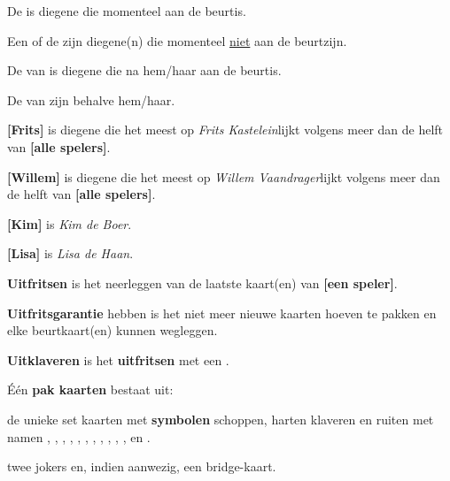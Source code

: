 \item De \huidigeSpeler is diegene die momenteel aan de beurt\footnotemark[1] is.  

\item Een \andereSpeler of de \andereSpelers zijn diegene(n) die momenteel \ul{niet} aan de beurt\footnotemark[1] zijn. 

\item De \volgendeSpeler van \eenSpeler is diegene die na hem/haar aan de beurt\footnotemark[1] is. 

\item De \medeSpelers van \eenSpeler zijn \alleSpelers behalve hem/haar.

\item \textbf{[Frits]} is diegene die het meest op \textit{Frits Kastelein}\footnotemark[2] lijkt volgens meer dan de helft van \textbf{[alle spelers]\footnotemark[3]}.

\item \textbf{[Willem]} is diegene die het meest op \textit{Willem Vaandrager}\footnotemark[2] lijkt volgens meer dan de helft van \textbf{[alle spelers]\footnotemark[3]}.

\item \label{item:kim}\textbf{[Kim]} is \textit{Kim de Boer}.

\item \label{item:lisa}\textbf{[Lisa]} is \textit{Lisa de Haan}.

\item \label{item:uitfritsen} \textbf{Uitfritsen} is het neerleggen van de laatste kaart(en) van \textbf{[een speler]}.

\item  \label{item:uitfritsgarantie} \textbf{Uitfritsgarantie} hebben is het niet meer nieuwe kaarten hoeven te pakken en elke beurt\footnotemark[1] kaart(en) kunnen wegleggen.

\item \label{item:uitklaver} \textbf{Uitklaveren} is het \textbf{uitfritsen} met een \footnotemark[4].

\item \label{item:kaarten} \'E\'en \textbf{pak kaarten} bestaat uit: 
    \puntLijst{}
        \item de unieke set kaarten met \textbf{symbolen} schoppen, harten klaveren en ruiten met namen , , , , , , , , , , ,  en .
        \item twee jokers en, indien aanwezig, een bridge-kaart.
    \eindPuntLijst{}

